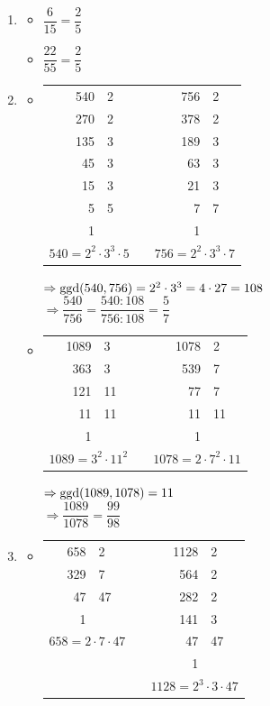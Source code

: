 \documentclass{bis}
\begin{document}
\begin{solution}
\begin{enumerate}
  \item \begin{itemize}
    \item $\dfrac{6}{15}=\dfrac{2}{5}$
    \item $\dfrac{22}{55}=\dfrac{2}{5}$
  \end{itemize}
  \item \begin{itemize}
    \item
    \begin{tabular}[t]{r|lp{2cm}r|l}
    540 & 2  & &  756 & 2\\
    270 & 2  & &  378 & 2\\
    135 & 3  & &  189 & 3\\
     45 & 3  & &   63 & 3\\
     15 & 3  & &   21 & 3\\
      5 & 5  & &    7 & 7\\
      1 &    & &    1 &  \\
    \multicolumn{2}{c}{$540=2^2\cdot 3^3\cdot 5$}
    &&\multicolumn{2}{c}{$756=2^2\cdot 3^3 \cdot 7$}
    \end{tabular}
    
    $\Rightarrow \ggd(540,756)=2^2\cdot 3^3 = 4\cdot 27= 108$\\[1em]
    $\Rightarrow \dfrac{540}{756}=\dfrac{540:108}{756:108}=\dfrac{5}{7}$
    \item
    \begin{tabular}[t]{r|lp{2cm}r|l}
    1089 & 3  & & 1078 & 2  \\
     363 & 3  & &  539 & 7  \\
     121 & 11 & &   77 & 7  \\
      11 & 11 & &   11 & 11 \\
       1 &    & &    1 &    \\
    \multicolumn{2}{c}{$1089=3^2\cdot 11^2$}
    &&\multicolumn{2}{c}{$1078=2\cdot 7^2\cdot 11$}
    \end{tabular}
    
    $\Rightarrow \ggd(1089,1078)=11$\\[1em]
    $\Rightarrow \dfrac{1089}{1078}=\dfrac{99}{98}$
  \end{itemize}
  \item \begin{itemize}
    \item
    \begin{tabular}[t]{r|lp{2cm}r|l}
    658 & 2  & & 1128 &  2\\
    329 & 7  & &  564 &  2\\
     47 & 47 & &  282 &  2\\
      1 &    & &  141 &  3\\
    \multicolumn{2}{c}{$658=2\cdot 7\cdot 47$}& &   47 & 47\\
    \multicolumn{2}{c}{}& &    1 &   \\
    \multicolumn{2}{c}{}
    &&\multicolumn{2}{c}{$1128=2^3\cdot 3\cdot 47$}
    \end{tabular}
    

\end{itemize}
\end{enumerate}
\end{solution}
\end{document}
